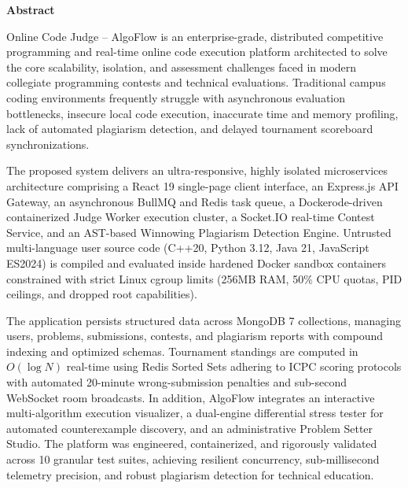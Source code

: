 \documentclass[12pt,a4paper]{report}
\begin{document}
\begin{center}
  \vspace*{0.3cm}
  {\large\bfseries Abstract\par}
\end{center}

\vspace{0.5cm}
{\normalsize
Online Code Judge -- AlgoFlow is an enterprise-grade, distributed competitive programming and real-time online code execution platform architected to solve the core scalability, isolation, and assessment challenges faced in modern collegiate programming contests and technical evaluations. Traditional campus coding environments frequently struggle with asynchronous evaluation bottlenecks, insecure local code execution, inaccurate time and memory profiling, lack of automated plagiarism detection, and delayed tournament scoreboard synchronizations.

The proposed system delivers an ultra-responsive, highly isolated microservices architecture comprising a React 19 single-page client interface, an Express.js API Gateway, an asynchronous BullMQ and Redis task queue, a Dockerode-driven containerized Judge Worker execution cluster, a Socket.IO real-time Contest Service, and an AST-based Winnowing Plagiarism Detection Engine. Untrusted multi-language user source code (C++20, Python 3.12, Java 21, JavaScript ES2024) is compiled and evaluated inside hardened Docker sandbox containers constrained with strict Linux cgroup limits (256MB RAM, 50\% CPU quotas, PID ceilings, and dropped root capabilities).

The application persists structured data across MongoDB 7 collections, managing users, problems, submissions, contests, and plagiarism reports with compound indexing and optimized schemas. Tournament standings are computed in $O(\log N)$ real-time using Redis Sorted Sets adhering to ICPC scoring protocols with automated 20-minute wrong-submission penalties and sub-second WebSocket room broadcasts. In addition, AlgoFlow integrates an interactive multi-algorithm execution visualizer, a dual-engine differential stress tester for automated counterexample discovery, and an administrative Problem Setter Studio. The platform was engineered, containerized, and rigorously validated across 10 granular test suites, achieving resilient concurrency, sub-millisecond telemetry precision, and robust plagiarism detection for technical education.
\par}

\clearpage
\end{document}
